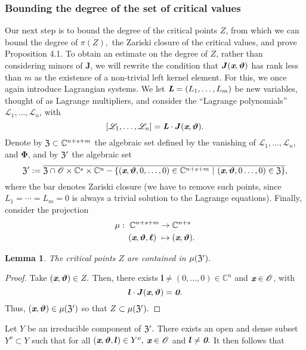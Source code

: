 \documentclass[a4paper]{article}
\def\sO{\mathscr{O}}
\def\bz{\textit{\textbf{0}}}
\def\thetab{\bm{\vartheta}}
\def\lb{{\bm l}}
\def\xb{\textit{\textbf{x}}}
\def\vt{\vartheta}
\def\dt{s}
\def\C{\mathbb{C}}
\newtheorem{lemma}[theorem]{Lemma}
\begin{document}
    \subsubsection{Bounding the degree of the set of critical values}
    Our next step is to bound the degree of the critical points $Z$, from which we can bound the degree of $\overline{\pi(Z)},$ the Zariski closure of the critical values, and prove Proposition 4.1. To obtain an estimate on the degree of $Z$, rather than
    considering minors of $\bm J$, we will rewrite the condition that $\bm
    J(\xb,\thetab)$ has rank less than $m$ as the existence of a
    non-trivial left kernel element. For this, we once again introduce Lagrangian systems. We let $\textit{\textbf{L}}=(L_1,\hdots,L_m)$ be new
    variables, thought of as Lagrange multipliers, and consider the
    ``Lagrange polynomials'' $\mathscr{L}_1,\dots,\mathscr{L}_{n}$, with
    \[
    [\mathscr{L}_1 ,\dots, \mathscr{L}_{n}]=\textit{\textbf{L}}\cdot \bm J(\xb,\thetab).
    \] 
    Denote by $\frak{Z} \subset \C^{n+\dt+m}$ the algebraic set defined by
    the vanishing of $\mathscr{L}_1,\hdots,\mathscr{L}_{n},$ and
    $\bm\Phi$, and by $\frak{Z}'$ the algebraic set
    \[
    \frak{Z}' := \overline{\frak{Z} \cap \sO \times \C^s \times \C^n - \{(\xb,\thetab,0,\hdots,0) \in \C^{n+\dt+m}~|~(\xb,\thetab,0\hdots,0) \in \frak{Z}\}},
    \]
    where the bar denotes Zariski closure (we have to remove such points,
    since $L_1=\cdots=L_m=0$ is always a trivial solution to the Lagrange
    equations). Finally, consider the projection
    \begin{align*} 
    \mu :~ \C^{n+\dt+m} &\rightarrow \C^{n+\dt}\\
    (\xb,\thetab,\bm \ell)~ &\mapsto (\xb,\thetab).
    \end{align*}
    \noindent 
    \begin{lemma}
    The critical points $Z$ are contained in $\mu(\frak{Z}').$
    \end{lemma}
    \begin{proof}
    Take $(\xb,\bm \vt) \in Z.$ Then, there exists $\lb \not = (0,\hdots,0) \in \C^n$ and $\xb \in \sO$, with 
    \[
    \lb \cdot \bm J(\xb,\thetab) = \bz.
    \]
    Thus, $(\xb,\bm \vt) \in \mu(\frak{Z}')$ so that $Z \subset \mu(\frak{Z}').$
    \end{proof}
    \noindent
    Let $Y$ be an irreducible component of $\frak{Z}'.$ There exists an open and dense subset $Y^o \subset Y$ such that for all $(\xb,\bm \vt,\lb) \in Y^o,$ $\xb \in \sO$ and $\lb \not = \bz.$ It then follows that 
\end{document}
